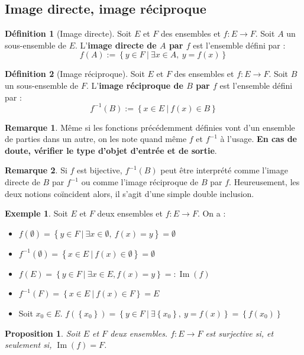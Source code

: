 \documentclass[french]{book}
\newcommand{\inv}{^{-1}}
\theoremstyle{plain}
\newtheorem{prop}{Proposition}[chapter]
\theoremstyle{definition}
\newtheorem{dfn}{Définition}[chapter]
\newtheorem{exa}{Exemple}[chapter]
\newtheorem{rmq}{Remarque}[chapter]
\theoremstyle{remark}
\DeclareMathOperator{\im}{Im}
\begin{document}
\subsection{Image directe, image réciproque}
\begin{dfn}[Image directe]
	Soit $E$ et $F$ des ensembles et $f:E\rightarrow F$. Soit $A$ un sous-ensemble de $E$. L'\textbf{image directe de $A$ par $f$} est l'ensemble défini par : $$f(A):=\left\{y\in F\ | \ \exists x\in A,\ y=f(x)\right\}$$
\end{dfn}
\begin{dfn}[Image réciproque]
	Soit $E$ et $F$ des ensembles et $f:E\rightarrow F$. Soit $B$ un sous-ensemble de $F$. L'\textbf{image réciproque de $B$ par $f$} est l'ensemble défini par : $$f\inv(B):=\left\{x\in E\ | \ f(x)\in B\right\}$$
\end{dfn}
\begin{rmq}
	Même si les fonctions précédemment définies vont d'un ensemble de parties dans un autre, on les note quand même $f$ et $f\inv$ à l'usage. \textbf{En cas de doute, vérifier le type d'objet d'entrée et de sortie}.
\end{rmq}
\begin{rmq}
	Si $f$ est bijective, $f\inv(B)$ peut être interprété comme l'image directe de $B$ par $f\inv$ ou comme l'image réciproque de $B$ par $f$. Heureusement, les deux notions coïncident alors, il s'agit d'une simple double inclusion.
\end{rmq}
\begin{exa}
	Soit $E$ et $F$ deux ensembles et $f:E\rightarrow F$. On a :
	\begin{itemize}
		\item $f(\emptyset)=\left\{y\in F\ | \ \exists x\in\emptyset, \ f(x)=y\right\}=\emptyset$
		\item $f\inv(\emptyset)=\left\{x\in E \ | \ f(x)\in\emptyset\right\}=\emptyset$
		\item $f(E)=\left\{y\in F\ | \ \exists x\in E, f(x)=y\right\}=:\im(f)$
		\item $f\inv(F)=\left\{x \in E\ | \ f(x)\in F\right\}=E$
		\item Soit $x_0\in E$. $f(\left\{x_0\right\})=\left\{y\in F\ | \ \exists\left\{x_0\right\},\ y=f(x)\right\}=\left\{f(x_0)\right\}$
	\end{itemize}
\end{exa}
\begin{prop}
	Soit $E$ et $F$ deux ensembles. $f:E\rightarrow F$ est surjective si, et seulement si, $\im(f)=F$.
\end{prop}
\end{document}
